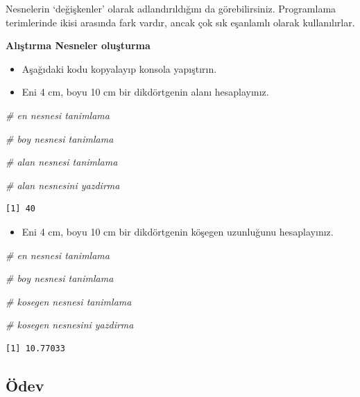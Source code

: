 \documentclass[
  oneside]{book}
\newenvironment{Shaded}{\begin{snugshade}}{\end{snugshade}}
\newcommand{\CommentTok}[1]{\textcolor[rgb]{0.56,0.35,0.01}{\textit{#1}}}
\providecommand{\tightlist}{%
  \setlength{\itemsep}{0pt}\setlength{\parskip}{0pt}}
\begin{document}
\begin{info}
Nesnelerin `değişkenler' olarak adlandırıldığını da görebilirsiniz.
Programlama terimlerinde ikisi arasında fark vardır, ancak çok sık
eşanlamlı olarak kullanılırlar.
\end{info}

\textbf{Alıştırma Nesneler oluşturma}

\begin{itemize}
\tightlist
\item
  Aşağıdaki kodu kopyalayıp konsola yapıştırın.
\item
  Eni 4 cm, boyu 10 cm bir dikdörtgenin alanı hesaplayınız.
\end{itemize}

\begin{Shaded}
\begin{Highlighting}[]
\CommentTok{\# en nesnesi tanimlama}

\CommentTok{\# boy nesnesi tanimlama}

\CommentTok{\# alan nesnesi tanimlama}

\CommentTok{\# alan nesnesini yazdirma}
\end{Highlighting}
\end{Shaded}

\begin{verbatim}
[1] 40
\end{verbatim}

\begin{itemize}
\tightlist
\item
  Eni 4 cm, boyu 10 cm bir dikdörtgenin köşegen uzunluğunu hesaplayınız.
\end{itemize}

\begin{Shaded}
\begin{Highlighting}[]
\CommentTok{\# en nesnesi tanimlama}

\CommentTok{\# boy nesnesi tanimlama}

\CommentTok{\# kosegen nesnesi tanimlama}

\CommentTok{\# kosegen nesnesini yazdirma}
\end{Highlighting}
\end{Shaded}

\begin{verbatim}
[1] 10.77033
\end{verbatim}

\hypertarget{uxf6dev}{%
\subsection{Ödev}\label{uxf6dev}}
\end{document}

